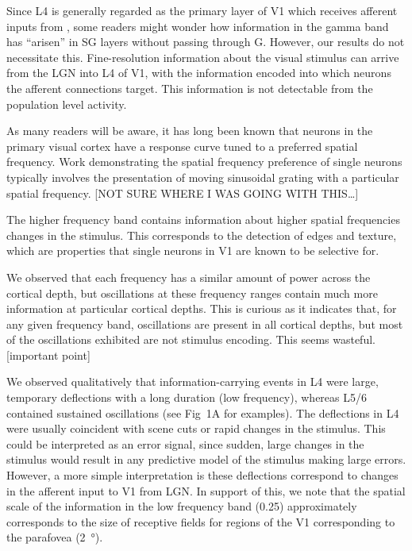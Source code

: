 Since \ac{L4} is generally regarded as the primary layer of \ac{V1} which receives afferent inputs from , some readers might wonder how information in the gamma band has ``arisen'' in \ac{SG} layers without passing through \ac{G}.
However, our results do not necessitate this.
Fine-resolution information about the visual stimulus can arrive from the \ac{LGN} into \ac{L4} of \ac{V1}, with the information encoded into which neurons the afferent connections target.
This information is not detectable from the population level activity.


As many readers will be aware, it has long been known that neurons in the primary visual cortex have a response curve tuned to a preferred spatial frequency.
Work demonstrating the spatial frequency preference of single neurons typically involves the presentation of moving sinusoidal grating with a particular spatial frequency.
[NOT SURE WHERE I WAS GOING WITH THIS{\dots}]

The higher frequency band contains information about higher spatial frequencies changes in the stimulus.
This corresponds to the detection of edges and texture, which are properties that single neurons in \ac{V1} are known to be selective for.


We observed that each frequency has a similar amount of power across the cortical depth, but oscillations at these frequency ranges contain much more information at particular cortical depths.
This is curious as it indicates that, for any given frequency band, oscillations are present in all cortical depths, but most of the oscillations exhibited are not stimulus encoding.
This seems wasteful.
[important point]

We observed qualitatively that information-carrying events in \ac{L4} were large, temporary deflections with a long duration (low frequency), whereas \acs{L5}/6 contained sustained oscillations (see Fig~1A for examples).
The deflections in \ac{L4} were usually coincident with scene cuts or rapid changes in the stimulus.
This could be interpreted as an error signal, since sudden, large changes in the stimulus would result in any predictive model of the stimulus making large errors.
However, a more simple interpretation is these deflections correspond to changes in the afferent input to \ac{V1} from \ac{LGN}.
In support of this, we note that the spatial scale of the information in the low frequency band (\SI{0.25}{\cpd}) approximately corresponds to the size of receptive fields for regions of the \ac{V1} corresponding to the parafovea (\SI{2}{\degree}).

